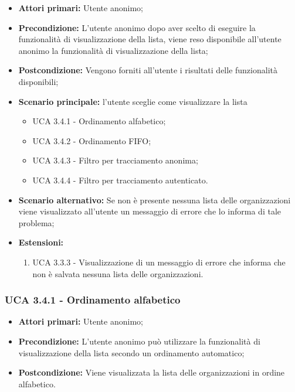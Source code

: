 \begin{itemize} 
	\item \textbf{Attori primari:} Utente anonimo;
	\item \textbf{Precondizione:} L'utente anonimo dopo aver scelto di eseguire la funzionalità di visualizzazione della lista, viene reso disponibile all'utente anonimo la funzionalità di visualizzazione della lista;
	\item \textbf{Postcondizione:} Vengono forniti all'utente i risultati delle funzionalità disponibili;
	\item \textbf{Scenario principale:}	l'utente sceglie come visualizzare la lista
	\begin{itemize}
		\item UCA 3.4.1 - Ordinamento alfabetico;
		\item UCA 3.4.2 - Ordinamento FIFO;
		\item UCA 3.4.3 - Filtro per tracciamento anonima;
		\item UCA 3.4.4 - Filtro per tracciamento autenticato.
	\end{itemize}
	\item \textbf{Scenario alternativo:} Se non è presente nessuna lista delle organizzazioni viene visualizzato all'utente un messaggio di errore che lo informa di tale problema;
	\item \textbf{Estensioni:}
	\begin{enumerate}
		\item UCA 3.3.3 - Visualizzazione di un messaggio di errore che informa che non è salvata nessuna lista delle organizzazioni.
	\end{enumerate}
\end{itemize}

\subsubsection{UCA 3.4.1 - Ordinamento alfabetico}%
\begin{itemize}
	\item \textbf{Attori primari:} Utente anonimo;
	\item \textbf{Precondizione:} L'utente anonimo può utilizzare la funzionalità di visualizzazione della lista secondo un ordinamento automatico;
	\item \textbf{Postcondizione:} Viene visualizzata la lista delle organizzazioni in ordine alfabetico.
\end{itemize}

